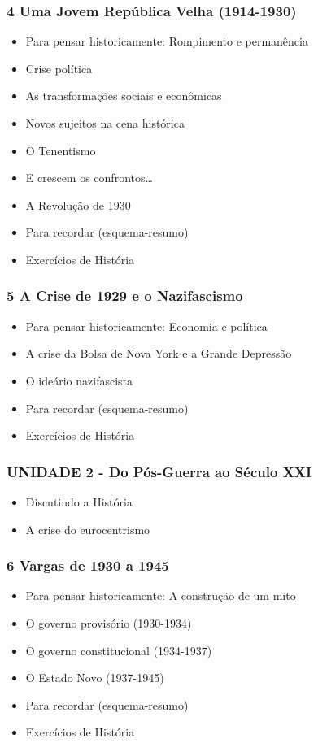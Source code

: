 \documentclass[a4paper,12pt]{article}[abntex2]
\begin{document}
\subsubsection*{4 Uma Jovem República Velha (1914-1930)}

\begin{itemize}
\item Para pensar historicamente: Rompimento e permanência
\item Crise política
\item As transformações sociais e econômicas
\item Novos sujeitos na cena histórica
\item O Tenentismo
\item E crescem os confrontos…
\item A Revolução de 1930
\item Para recordar (esquema-resumo)
\item Exercícios de História
\end{itemize}
\subsubsection*{5 A Crise de 1929 e o Nazifascismo}

\begin{itemize}
\item Para pensar historicamente: Economia e política
\item A crise da Bolsa de Nova York e a Grande Depressão
\item O ideário nazifascista
\item Para recordar (esquema-resumo)
\item Exercícios de História
\end{itemize}
\subsubsection*{UNIDADE 2 - Do Pós-Guerra ao Século XXI}

\begin{itemize}
\item Discutindo a História
\item A crise do eurocentrismo
\end{itemize}
\subsubsection*{6 Vargas de 1930 a 1945}

\begin{itemize}
\item Para pensar historicamente: A construção de um mito
\item O governo provisório (1930-1934)
\item O governo constitucional (1934-1937)
\item O Estado Novo (1937-1945)
\item Para recordar (esquema-resumo)
\item Exercícios de História
\end{itemize}
\end{document}
